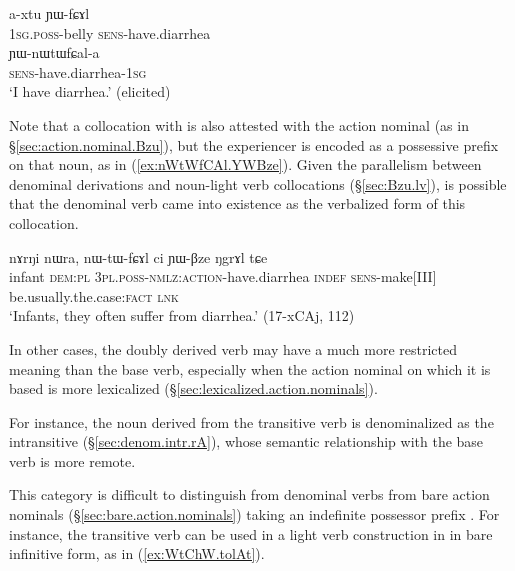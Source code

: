 \begin{exe}
\ex \label{ex:axtu.YWfCAl}
\gll a-xtu ɲɯ-fɕɤl \\
\textsc{1sg}.\textsc{poss}-belly \textsc{sens}-have.diarrhea \\
\ex \label{ex:YWnWtWfCala}
\gll ɲɯ-nɯtɯfɕal-a \\
\textsc{sens}-have.diarrhea-\textsc{1sg} \\
\glt `I have diarrhea.' (elicited)
\end{exe}

Note that a collocation with  is also attested with the action nominal  (as in §\ref{sec:action.nominal.Bzu}), but the experiencer is encoded as a possessive prefix on that noun, as  in (\ref{ex:nWtWfCAl.YWBze}). Given the parallelism between denominal derivations and noun-light verb collocations (§\ref{sec:Bzu.lv}), is possible that the denominal verb  came into existence as the verbalized form of this collocation.

\begin{exe}
\ex \label{ex:nWtWfCAl.YWBze}
\gll nɤrŋi nɯra, nɯ-tɯ-fɕɤl ci ɲɯ-βze ŋgrɤl tɕe \\
infant \textsc{dem}:\textsc{pl} \textsc{3pl}.\textsc{poss}-\textsc{nmlz}:\textsc{action}-have.diarrhea \textsc{indef} \textsc{sens}-make[III] be.usually.the.case:\textsc{fact} \textsc{lnk} \\
\glt `Infants, they often suffer from diarrhea.' (17-xCAj, 112)
\end{exe}

In other cases, the doubly derived verb may have a much more restricted meaning than the base verb, especially when the action nominal on which it is based is more lexicalized (§\ref{sec:lexicalized.action.nominals}). 

For instance, the noun  derived from the transitive verb  is denominalized as the intransitive  (§\ref{sec:denom.intr.rA}), whose semantic relationship with the base verb is more remote.

This category is difficult to distinguish from denominal verbs from bare action nominals (§\ref{sec:bare.action.nominals}) taking an indefinite possessor prefix . For instance, the transitive verb  can be used in a light verb construction in  in bare infinitive form, as in (\ref{ex:WtChW.tolAt}).

